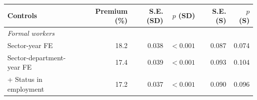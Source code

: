 \begin{tabular}{lrrrrr}
\toprule
    Controls & Premium (\%) & S.E. (SD) & $p$ (SD) & S.E. (S) & $p$ (S) \\
    \midrule
\multicolumn{6}{l}{\textit{Formal workers}} \\
Sector-year FE & 18.2 & 0.038 & $<0.001$ & 0.087 & 0.074 \\
Sector-department-year FE & 17.4 & 0.039 & $<0.001$ & 0.093 & 0.104 \\
+ Status in employment & 17.2 & 0.037 & $<0.001$ & 0.090 & 0.096\\
\bottomrule\end{tabular}
